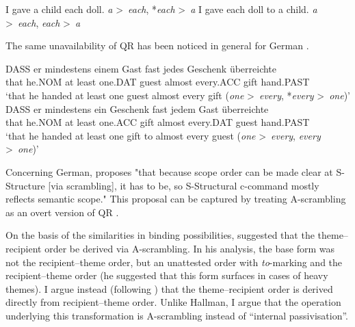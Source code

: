 \begin{exe}
\ex \cite[ex 2]{Bruening.2001}
\begin{xlist}
\ex I gave a child each doll. \hfill \textit{a} \textgreater \  \textit{each}, *\textit{each} \textgreater \ \textit{a}
\ex I gave each doll to a child. \hfill \textit{a} \textgreater \  \textit{each}, \textit{each} \textgreater \ \textit{a}
\end{xlist}
\end{exe}
The same unavailability of QR has been noticed in general for German \citep{Frey.1993}. 
\begin{exe}
\ex \cite[exx 22 \& 21]{Frey.1993}
\begin{xlist}
\ex \gll DASS er mindestens einem Gast fast jedes Geschenk überreichte\\
that he.NOM {at least} one.DAT guest almost every.ACC gift hand.PAST\\
\trans `that he handed at least one guest almost every gift (\textit{one} \textgreater \ \textit{every}, *\textit{every} \textgreater \ \textit{one})'
\ex \gll DASS er mindestens ein Geschenk fast jedem Gast überreichte\\
that he.NOM {at least} one.ACC gift almost every.DAT guest hand.PAST\\
\trans `that he handed at least one gift to almost every guest (\textit{one} \textgreater \ \textit{every}, \textit{every} \textgreater \ \textit{one})'
\end{xlist}
\end{exe}

Concerning German, \cite[44]{Beck.1996} proposes "that because scope order can be made clear at S-Structure [via scrambling], it has to be, so S-Structural c-command mostly reflects semantic scope." This proposal can be captured by treating A-scrambling as an overt version of QR \citep{Tonoike.1997,Abe.2005,Miyagawa.2006}.

On the basis of the similarities in binding possibilities, \cite{Takano.1998} suggested that the theme--recipient order be derived via A-scrambling. In his analysis, the base form was not the recipient--theme order, but an unattested order with \textit{to}-marking and the recipient--theme order (he suggested that this form surfaces in cases of heavy themes). I argue instead (following \cite{Hallman.2015}) that the theme--recipient order is derived directly from recipient--theme order. Unlike Hallman, I argue that the operation underlying this transformation is A-scrambling instead of ``internal passivisation''. 

